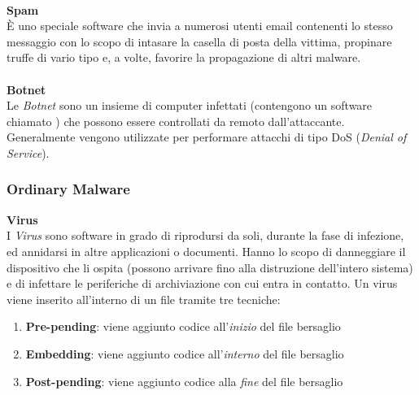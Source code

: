 \\
\textbf{Spam}\\
È uno speciale software che invia a numerosi utenti email contenenti lo stesso messaggio con lo scopo di intasare la casella di posta della vittima, propinare truffe di vario tipo e, a volte, favorire la propagazione di altri malware.\\
\\
\textbf{Botnet}\\
Le \textit{Botnet} sono un insieme di computer infettati (contengono un software chiamato ) che possono essere controllati da remoto dall'attaccante. Generalmente vengono utilizzate per performare attacchi di tipo DoS (\textit{Denial of Service}).

\pagebreak

\subsubsection{Ordinary Malware}

\textbf{Virus}\\
I \textit{Virus} sono software in grado di riprodursi da soli, durante la fase di infezione, ed annidarsi in altre applicazioni o documenti. Hanno lo scopo di danneggiare il dispositivo che li ospita (possono arrivare fino alla distruzione dell'intero sistema) e di infettare le periferiche di archiviazione con cui entra in contatto. Un virus viene inserito all'interno di un file tramite tre tecniche:

\begin{enumerate}
    \item \textbf{Pre-pending}: viene aggiunto codice all'\textit{inizio} del file bersaglio
    \item \textbf{Embedding}: viene aggiunto codice all'\textit{interno} del file bersaglio
    \item \textbf{Post-pending}: viene aggiunto codice alla \textit{fine} del file bersaglio
\end{enumerate}

